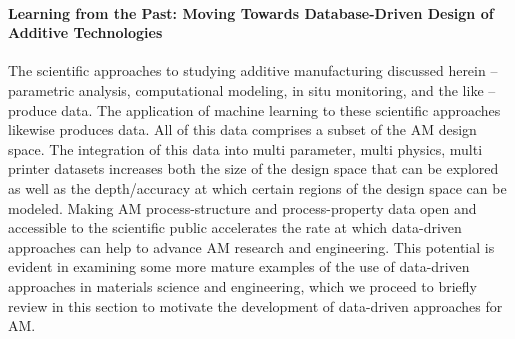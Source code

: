 \paragraph{Learning from the Past: Moving Towards Database-Driven Design of Additive Technologies}
The scientific approaches to studying additive manufacturing discussed herein -- parametric analysis, computational modeling, in situ monitoring, and the like -- produce data. The application of machine learning to these scientific approaches likewise produces data. All of this data comprises a subset of the AM design space. The integration of this data into multi parameter, multi physics, multi printer datasets increases both the size of the design space that can be explored as well as the depth/accuracy at which certain regions of the design space can be modeled. Making AM process-structure and process-property data open and accessible to the scientific public accelerates the rate at which data-driven approaches can help to advance AM research and engineering. This potential is evident in examining some more mature examples of the use of data-driven approaches in materials science and engineering, which we proceed to briefly review in this section to motivate the development of data-driven approaches for AM. 

